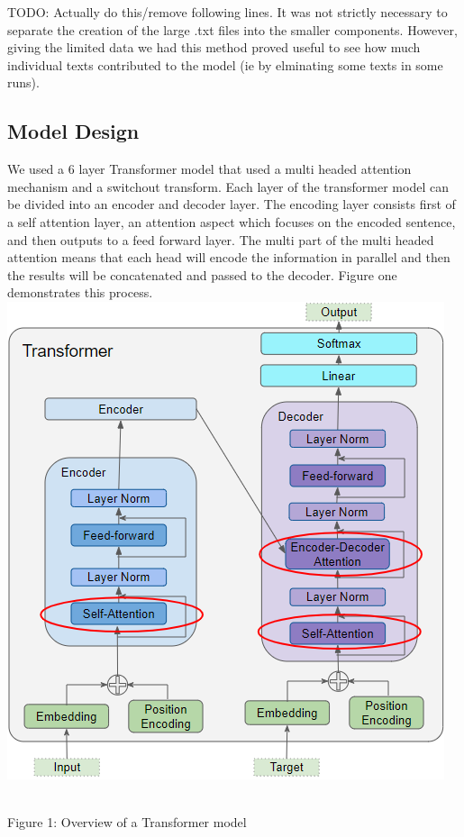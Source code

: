 \documentclass[letterpaper, 10 pt, conference]{ieeeconf}  %
\begin{document}
TODO: Actually do this/remove following lines. It was not strictly necessary to separate the creation of the large .txt files into the smaller components. However, giving the limited data we had this method proved useful to see how much individual texts contributed to the model (ie by elminating some texts in some runs). 



\subsection{Model Design}
We used a 6 layer Transformer model that used a multi headed attention mechanism and a switchout transform. Each layer of the transformer model can be divided into an encoder and decoder layer. The encoding layer consists first of a self attention layer, an attention aspect which focuses on the encoded sentence, and then outputs to a feed forward layer. The multi part of the multi headed attention means that each head will encode the information in parallel and then the results will be concatenated and passed to the decoder. Figure one demonstrates this process.
\includegraphics[scale=.4]{Transformer.png}
\caption{\\Figure 1: Overview of a Transformer model}
\\
\end{document}

